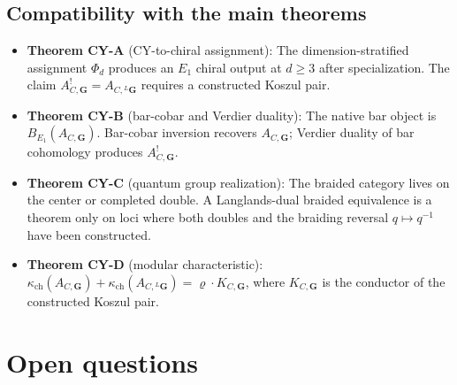 \documentclass[11pt]{article}
\theoremstyle{definition}
\theoremstyle{remark}
\begin{document}
\begin{center}
\end{center}

\subsection{Compatibility with the main theorems}

\begin{itemize}
\item \textbf{Theorem CY-A} (CY-to-chiral assignment): The
dimension-stratified assignment $\Phi_d$ produces an $E_1$ chiral output
at $d\geq 3$ after specialization. The claim
$A_{C,\mathbf{G}}^! = A_{C,{}^L\mathbf{G}}$ requires a constructed
Koszul pair.

\item \textbf{Theorem CY-B} (bar-cobar and Verdier duality): The
native bar object is $B_{E_1}(A_{C,\mathbf{G}})$. Bar-cobar inversion
recovers $A_{C,\mathbf{G}}$; Verdier duality of bar cohomology produces
$A_{C,\mathbf{G}}^!$.

\item \textbf{Theorem CY-C} (quantum group realization): The braided
category lives on the center or completed double. A Langlands-dual
braided equivalence is a theorem only on loci where both doubles and
the braiding reversal $q \mapsto q^{-1}$ have been constructed.

\item \textbf{Theorem CY-D} (modular characteristic):
$\kappa_{\mathrm{ch}}(A_{C,\mathbf{G}}) + \kappa_{\mathrm{ch}}(A_{C,{}^L\mathbf{G}}) =
\varrho \cdot K_{C,\mathbf{G}}$, where
$K_{C,\mathbf{G}}$ is the conductor of the constructed Koszul pair.
\end{itemize}


\section{Open questions}
\label{sec:open}
\end{document}
